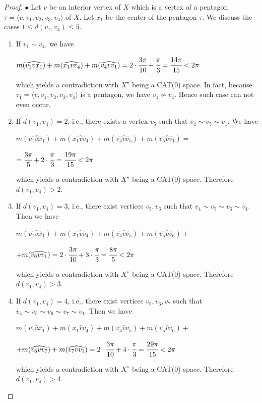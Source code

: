 \documentclass{amsart}
\theoremstyle{definition}
\theoremstyle{remark}
\numberwithin{equation}{section}
\begin{document}
\begin{proof}
$\bullet$ Let $v$ be an interior vertex of $X$ which is a vertex of a pentagon  $\tau = \langle v,v_{1}, v_{2}, v_{3}, v_{4} \rangle$ of $X$.
Let $x_{1}$ be the center of the pentagon $\tau$.  We discuss the cases $1 \leq d(v_{1},v_{4}) \leq 5$. 

\begin{enumerate}
\item If $v_{1} \sim v_{4}$, we have
\begin{center}
$m(\widehat {v_{1} v x_{1}}) + m(\widehat {x_{1} v v_{4}}) + m(\widehat {v_{4} v v_{1}}) = 2 \cdot \cfrac{3 \pi}{10} + \cfrac{\pi}{3} = \cfrac{14 \pi}{15} < 2 \pi$
\end{center}  which yields a contradiction with $X^{\star}$ being a CAT(0) space. In fact, because $\tau_{1} = \langle v,v_{1}, v_{2}, v_{3}, v_{4} \rangle$ is a pentagon, we have $v_{1} \nsim v_{4}$. Hence such case can not even occur.


\item If $d(v_{1}, v_{4}) = 2$, i.e., there exists a vertex $v_{5}$ such that $v_{4} \sim v_{5} \sim v_{1}$. We have
\begin{center}
$m(\widehat {v_{1} v x_{1}}) + m(\widehat {x_{1} v v_{4}}) + m(\widehat {v_{4} v v_{5}}) + m(\widehat {v_{5} v v_{1}}) =$
\end{center}
\begin{center}
$= \cfrac{3 \pi}{5} + 2 \cdot \cfrac{\pi}{3} = \cfrac{19 \pi}{15} < 2 \pi$
\end{center}  which yields a contradiction with $X^{\star}$ being a CAT(0) space. Therefore $d(v_{1},v_{4}) > 2$.



\item If $d(v_{1}, v_{4}) = 3$, i.e., there exist vertices $v_{5}, v_{6}$ such that $v_{4} \sim v_{5} \sim v_{6} \sim v_{1}$. Then we have
\begin{center}
$m(\widehat {v_{1} v x_{1}}) + m(\widehat {x_{1} v v_{4}}) + m(\widehat {v_{4} v v_{5}}) + m(\widehat {v_{5} v v_{6}}) +$
\end{center}
\begin{center}
$+ m(\widehat {v_{6} v v_{1}}) = 2 \cdot \cfrac{3 \pi}{10} + 3 \cdot \cfrac{\pi}{3} = \cfrac{8 \pi}{5} < 2 \pi$
\end{center}  which yields a contradiction with $X^{\star}$ being a CAT(0) space. Therefore $d(v_{1},v_{4}) > 3$.


\item If $d(v_{1}, v_{4}) = 4$, i.e., there exist vertices $v_{5}, v_{6}, v_{7}$ such that $v_{4} \sim v_{5} \sim v_{6} \sim v_{7} \sim v_{1}$. Then we have
\begin{center}
$m(\widehat {v_{1} v x_{1}}) + m(\widehat {x_{1} v v_{4}}) + m(\widehat {v_{4} v v_{5}}) + m(\widehat {v_{5} v v_{6}}) +$
\end{center}
\begin{center}
$+ m(\widehat {v_{6} v v_{7}}) + m(\widehat {v_{7} v v_{1}}) = 2 \cdot \cfrac{3 \pi}{10} + 4 \cdot \cfrac{\pi}{3} = \cfrac{29 \pi}{15} < 2 \pi$
\end{center} which yields a contradiction with $X^{\star}$ being a CAT(0) space. Therefore $d(v_{1},v_{4}) > 4$.



\end{enumerate}
\end{proof}
\end{document}
